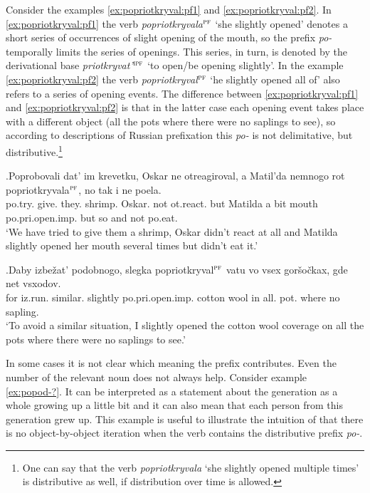 Consider the examples \ref{ex:popriotkryval:pf1} and \ref{ex:popriotkryval:pf2}. In \ref{ex:popriotkryval:pf1} the verb \textit{popriotkryvala}$^{\textsc{pf}}$ `she slightly opened' denotes a short series of occurrences of slight opening of the mouth, so the prefix \textit{po-} temporally limits the series of openings. This series, in turn, is denoted by the derivational base \textit{priotkryvat'}$^{\textsc{ipf}}$ `to open/be opening slightly'. In the example \ref{ex:popriotkryval:pf2} the verb  \textit{popriotkryval}$^{\textsc{pf}}$ `he slightly opened all of' also refers to a series of opening events. The difference between \ref{ex:popriotkryval:pf1} and \ref{ex:popriotkryval:pf2} is that in the latter case each opening event takes place with a different object (all the pots where there were no saplings to see), so according to descriptions of Russian prefixation this \textit{po-} is not delimitative, but distributive.\footnote{One can say that the verb \textit{popriotkryvala} `she slightly opened multiple times' is distributive as well, if distribution over time is allowed.}

\exg.\label{ex:popriotkryval:pf1}Poprobovali dat' im krevetku, Oskar ne otreagiroval, a Matil'da nemnogo rot popriotkryvala$^{\textsc{pf}}$, no tak i ne poela.\\
po.try. give. they. shrimp. Oskar. not ot.react. but Matilda {a bit} mouth po.pri.open.imp. but so and not po.eat.\\
\trans `We have tried to give them a shrimp, Oskar didn't react at all and Matilda slightly opened her mouth several times but didn't eat it.'\\

\exg.\label{ex:popriotkryval:pf2}Daby izbe\v{z}at' podobnogo, slegka popriotkryval$^{\textsc{pf}}$ vatu vo vsex gor\v{s}o\v{c}kax, gde net vsxodov.\\
for iz.run. similar. slightly po.pri.open.imp. {cotton wool} in all. pot. where no sapling.\\
\trans `To avoid a similar situation, I slightly opened the cotton wool coverage on all the pots where there were no saplings to see.'\\

In some cases it is not clear which meaning the prefix contributes. Even the number of the relevant noun does not always help. Consider example \ref{ex:popod-?}. It can be interpreted as a statement about the generation as a whole growing up a little bit and it can also mean that each person from this generation grew up. This example is useful to illustrate the intuition of \citet{Isachenko:60} that there is no object-by-object iteration when the verb contains the distributive prefix \textit{po-}.

